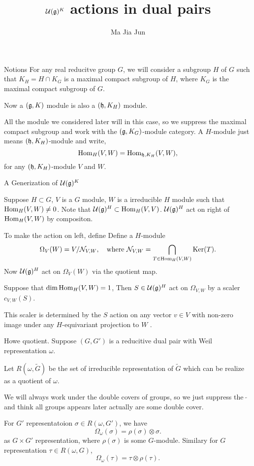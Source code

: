 \documentclass{beamer}
\begin{document}


\title[$\cuu(\fgg)^K$ in dual pairs]{$\cuu(\fgg)^K$ actions in dual pairs}
\author{Ma Jia Jun}

\begin{frame}[plain]
  \titlepage
\end{frame}

\begin{frame}{Notions}
For any real reducitve group $G$, 
we will consider a subgroup $H$ of $G$ such that $K_H = H\cap K_G$ is a maximal 
compact subgroup of $H$, where $K_G$ is the maximal compact subgroup of $G$.

Now a $(\mathfrak{g},K)$ module is also a $(\mathfrak{h},K_H)$ module.

All the module we considered later will in this case, 
so we suppress the maximal compact subgroup and work with 
the $(\mathfrak{g},K_G)$-module category.
A $H$-module just means $(\mathfrak{h},K_H)$-module and write,
\[
{\rm Hom}_{H}(V,W) = {\rm Hom}_{\mathfrak{h},K_H}(V,W),
\]
for any $(\mathfrak{h},K_H)$-module $V$ and $W$.
\end{frame}

\begin{frame}{A Generization of $\cuu(\fgg)^K$}


Suppose $H\subset G$,  $V$ is a $G$ module, $W$ is a irreducible $H$ module
 such that
${\rm Hom}_{H}(V,W)\neq 0$.
Note that $\mathcal{U}(\mathfrak{g})^H \subset {\rm Hom}_H(V,V)$. $\mathcal{U}(\mathfrak{g})^H$ act on right 
of ${\rm Hom}_H(V,W)$ by compositon.

To make the action on left, define
Define a $H$-module \[
\Omega_V(W) = V / \mathcal{N}_{V,W},
\quad \text{where }
\mathcal{N}_{V,W} = \bigcap_{T\in {\rm Hom}_H(V,W)}{\rm Ker}(T).
\]
Now $\mathcal{U}(\mathfrak{g})^H$ act on $\Omega_V(W)$ via the quotient map.

\begin{lemma}
Suppose that $\dim {\rm Hom}_{H}(V,W)=1$,
Then $S \in \mathcal{U}(\mathfrak{g})^H$ act on $\Omega_{V,W}$ by a  scaler $c_{V,W}(S)$.
\end{lemma}
\rmk This scaler is determined by the $S$ action on any vector $v\in V$ with 
non-zero image under any $H$-equivariant projection to $W$ .

\end{frame}


\begin{frame}{Howe quotient.}
Suppose $(G,G')$ is a reducitive dual pair with 
Weil representation $\omega$.

Let $R(\omega,\widetilde{G})$
be the set of irreducible  representation of $\widetilde{G}$
which can be realize as a quotient of $\omega$.

We will always work under the double covers of groups, so
we just suppress the $\widetilde{\ \  }$ and think all groups 
appears later actually are some double cover.

For $G'$ representatoion $\sigma \in R(\omega,G')$, we have
\[
 \Omega_\omega(\sigma) = \rho(\sigma)\otimes \sigma.
\]
 as $G\times G'$ representation, where $\rho(\sigma)$ is some $G$-module.
Similary for $G$ representation $\tau\in R(\omega,G)$,
\[
 \Omega_\omega(\tau) = \tau\otimes \rho(\tau).
\]

\end{frame}
\end{document}

